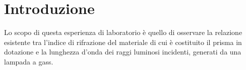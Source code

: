 \section{Introduzione}

Lo scopo di questa esperienza di laboratorio è quello di osservare la relazione esistente tra l'indice di rifrazione del materiale di cui è costituito il prisma in dotazione e la lunghezza d'onda dei raggi luminosi incidenti, generati da una lampada a gass.


